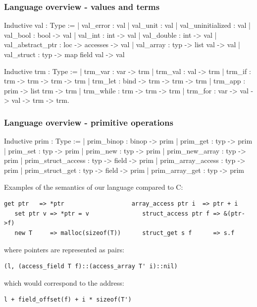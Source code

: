 \begin{frame}[fragile]
\frametitle{Language overview - values and terms}

\begin{coqs}
Inductive val : Type :=
  | val_error : val
  | val_unit : val
  | val_uninitialized : val
  | val_bool : bool -> val
  | val_int : int -> val
  | val_double : int -> val
  | val_abstract_ptr : loc -> accesses -> val
  | val_array : typ -> list val -> val
  | val_struct : typ -> map field val -> val
\end{coqs}

\begin{coqs}
Inductive trm : Type :=
  | trm_var : var -> trm
  | trm_val : val -> trm
  | trm_if : trm -> trm -> trm -> trm
  | trm_let : bind -> trm -> trm -> trm
  | trm_app : prim -> list trm -> trm
  | trm_while : trm -> trm -> trm
  | trm_for : var -> val -> val -> trm -> trm.
\end{coqs}

\end{frame}


\begin{frame}[fragile]
\frametitle{Language overview - primitive operations}

\begin{coqs}
  Inductive prim : Type :=
    | prim_binop : binop -> prim
    | prim_get : typ -> prim
    | prim_set : typ -> prim
    | prim_new : typ -> prim
    | prim_new_array : typ -> prim
    | prim_struct_access : typ -> field -> prim
    | prim_array_access : typ -> prim
    | prim_struct_get : typ -> field -> prim
    | prim_array_get : typ -> prim
\end{coqs}

Examples of the semantics of our language compared to C:

\begin{Verbatim}[fontsize=\scriptsize]
   get ptr   => *ptr                   array_access ptr i  => ptr + i
   set ptr v => *ptr = v               struct_access ptr f => &(ptr->f)
   new T     => malloc(sizeof(T))      struct_get s f      => s.f
\end{Verbatim}

where pointers are represented as pairs:

\begin{Verbatim}[fontsize=\scriptsize]
   (l, (access_field T f)::(access_array T' i)::nil)
\end{Verbatim}

which would correspond to the address:

\begin{Verbatim}[fontsize=\scriptsize]
   l + field_offset(f) + i * sizeof(T')
\end{Verbatim}

\end{frame}


